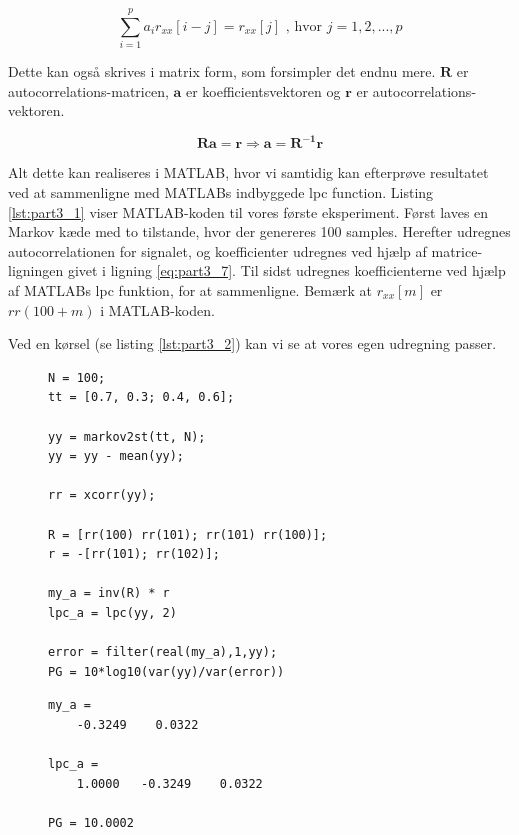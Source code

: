 \begin{itemize}
	\begin{equation}
		\sum^p_{i=1} a_i r_{xx}[i-j] = r_{xx}[j] \text{ , hvor } j = 1,2,...,p
	\end{equation}

	Dette kan også skrives i matrix form, som forsimpler det endnu mere. $\mathbf{R}$ er autocorrelations-matricen, $\mathbf{a}$ er koefficientsvektoren og $\mathbf{r}$ er autocorrelations-vektoren.

	\begin{equation}\label{eq:part3_7}
		\mathbf{Ra} = \mathbf{r} \Rightarrow \mathbf{a} = \mathbf{R^{-1} r}
	\end{equation}
\end{itemize}


Alt dette kan realiseres i MATLAB, hvor vi samtidig kan efterprøve resultatet ved at sammenligne med MATLABs indbyggede lpc function. Listing \ref{lst:part3_1} viser MATLAB-koden til vores første eksperiment. Først laves en Markov kæde med to tilstande, hvor der genereres 100 samples. Herefter udregnes autocorrelationen for signalet, og koefficienter udregnes ved hjælp af matrice-ligningen givet i ligning \ref{eq:part3_7}. Til sidst udregnes koefficienterne ved hjælp af MATLABs lpc funktion, for at sammenligne. Bemærk at $r_{xx}[m]$ er $rr(100 + m)$ i MATLAB-koden.

Ved en kørsel (se listing \ref{lst:part3_2}) kan vi se at vores egen udregning passer. 

\lstset{language=MATLAB,numbers=left}
\begin{figure}
	\begin{lstlisting}[frame=single, caption=Udregning af LPC koefficienter,label=lst:part3_1]
N = 100;
tt = [0.7, 0.3; 0.4, 0.6];

yy = markov2st(tt, N);
yy = yy - mean(yy);

rr = xcorr(yy);

R = [rr(100) rr(101); rr(101) rr(100)];
r = -[rr(101); rr(102)];

my_a = inv(R) * r
lpc_a = lpc(yy, 2)

error = filter(real(my_a),1,yy);
PG = 10*log10(var(yy)/var(error))
	\end{lstlisting}
\end{figure}


\lstset{language=MATLAB,numbers=left}
\begin{figure}
	\begin{lstlisting}[frame=single, caption=Udregning af LPC koefficienter - output,label=lst:part3_2]
my_a =
    -0.3249    0.0322

lpc_a =
    1.0000   -0.3249    0.0322

PG = 10.0002
	\end{lstlisting}
\end{figure}

